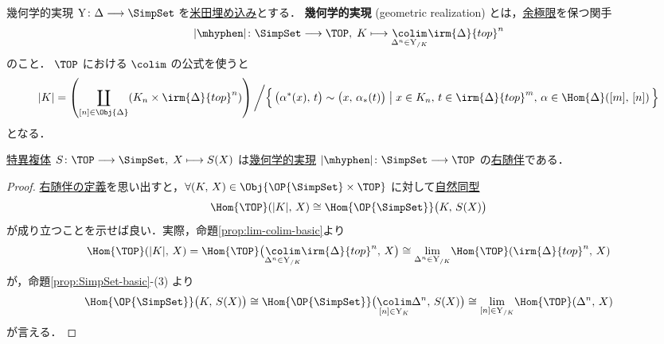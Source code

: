 \documentclass[TQFT_main]{subfiles}
\begin{document}
\begin{mydef}[label=def:geometric-realization]{幾何学的実現}
    $\mathrm{Y} \colon \Delta \lto \SimpSet$ を\hyperref[def:representable]{米田埋め込み}とする．
    \textbf{幾何学的実現} (geometric realization) とは，\hyperref[def:colim]{余極限}を保つ関手
    \begin{align}
        \abs{\mhyphen} \colon \SimpSet \lto \TOP,\; K \lmto \underset{\Delta^n \in \mathrm{Y}_{/K}}{\colim} \irm{\Delta}{top}^n
    \end{align}
    のこと．
    \tcblower
    $\TOP$ における $\colim$ の公式を使うと
    \begin{align}
        \abs{K} =  \left( \coprod_{[n] \in \Obj{\Delta}} (K_n \times \irm{\Delta}{top}^n)  \right) \bigg/ \Bigl\{\, \bigl(\alpha^*(x),\, t\bigr) \sim \bigl(x,\, \alpha_*(t)\bigr) \bigm| x \in K_n,\, t \in \irm{\Delta}{top}^m,\, \alpha \in \Hom{\Delta}([m],\, [n]) \,\Bigr\} 
    \end{align}
    となる．
\end{mydef}

\begin{myprop}[label=prop:geometry-realization]{}
    \hyperref[def:simplicial-top]{特異複体} $S \colon \TOP \lto \SimpSet,\; X \lmto S(X)$ は\hyperref[def:geometric-realization]{幾何学的実現} $\abs{\mhyphen} \colon \SimpSet \lto \TOP$ の\hyperref[def:adjoint]{右随伴}である．
\end{myprop}

\begin{proof}
    \hyperref[def:adjoint]{右随伴の定義}を思い出すと，$\forall (K,\, X) \in \Obj{\OP{\SimpSet} \times \TOP}$ に対して\hyperref[def:nat]{自然同型}
    \begin{align}
        \Hom{\TOP} (\abs{K},\, X) \cong \Hom{\OP{\SimpSet}} \bigl(K,\, S(X)\bigr)
    \end{align}
    が成り立つことを示せば良い．実際，命題\ref{prop:lim-colim-basic}より
    \begin{align}
        \Hom{\TOP} (\abs{K},\, X) = \Hom{\TOP} \bigl( \underset{\Delta^n \in \mathrm{Y}_{/K}}{\colim} \irm{\Delta}{top}^n,\, X \bigr) \cong \underset{\Delta^n \in \mathrm{Y}_{/K}}{\lim} \Hom{\TOP}(\irm{\Delta}{top}^n,\, X)
    \end{align}
    が，命題\ref{prop:SimpSet-basic}-(3) より
    \begin{align}
        \Hom{\OP{\SimpSet}} \bigl(K,\, S(X)\bigr) \cong \Hom{\OP{\SimpSet}} \bigl( \underset{[n] \in \mathrm{Y}_K}{\colim} \Delta^n,\, S(X) \bigr) \cong \underset{[n] \in \mathrm{Y}_{/K}}{\lim} \Hom{\TOP}(\Delta^n,\, X)
    \end{align}
    が言える．
\end{proof}
\end{document}
